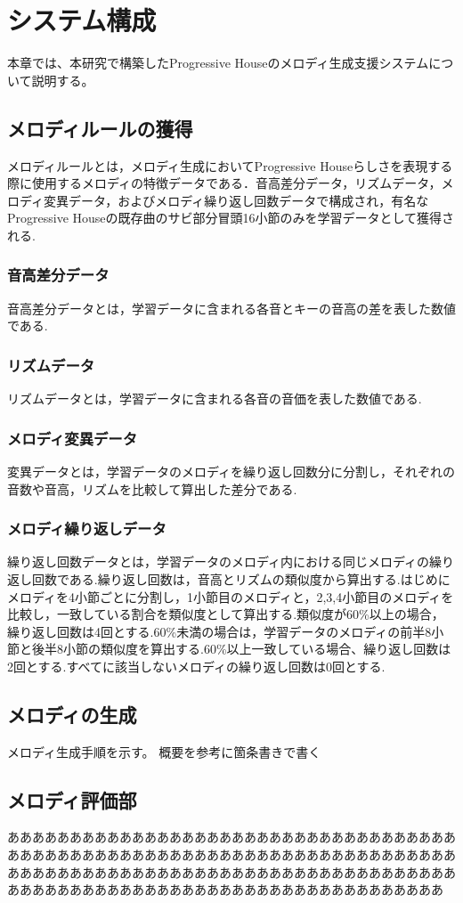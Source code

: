 \chapter{システム構成}
本章では、本研究で構築したProgressive Houseのメロディ生成支援システムについて説明する。

\section{メロディルールの獲得}
メロディルールとは，メロディ生成においてProgressive Houseらしさを表現する際に使用するメロディの特徴データである．音高差分データ，リズムデータ，メロディ変異データ，およびメロディ繰り返し回数データで構成され，有名なProgressive Houseの既存曲のサビ部分冒頭16小節のみを学習データとして獲得される.
\subsection{音高差分データ}
音高差分データとは，学習データに含まれる各音とキーの音高の差を表した数値である.
\subsection{リズムデータ}
リズムデータとは，学習データに含まれる各音の音価を表した数値である.
\subsection{メロディ変異データ}
変異データとは，学習データのメロディを繰り返し回数分に分割し，それぞれの音数や音高，リズムを比較して算出した差分である.
\subsection{メロディ繰り返しデータ}
繰り返し回数データとは，学習データのメロディ内における同じメロディの繰り返し回数である.繰り返し回数は，音高とリズムの類似度から算出する.はじめにメロディを4小節ごとに分割し，1小節目のメロディと，2,3,4小節目のメロディを比較し，一致している割合を類似度として算出する.類似度が60\%以上の場合，繰り返し回数は4回とする.60\%未満の場合は，学習データのメロディの前半8小節と後半8小節の類似度を算出する.60\%以上一致している場合、繰り返し回数は2回とする.すべてに該当しないメロディの繰り返し回数は0回とする.

\section{メロディの生成}
メロディ生成手順を示す。
概要を参考に箇条書きで書く


\section{メロディ評価部}
あああああああああああああああああああああああああああああああああああああああああああああああああああああああああああああああああああああああああああああああああああああああああああああああああああああああああああああああああああああああああああああああああああああああああああああああ

